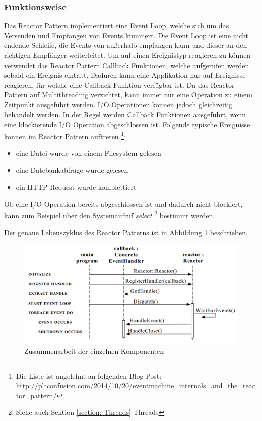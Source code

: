 \subsubsection{Funktionsweise}

Das Reactor Pattern implementiert eine Event Loop, welche sich um das Versenden und Empfangen von Events kümmert. Die Event Loop ist eine nicht endende Schleife, die Events von außerhalb empfangen kann und dieser an den richtigen Empfänger weiterleitet. Um auf einen Ereignistyp reagieren zu können verwendet das Reactor Pattern Callback Funktionen, welche aufgerufen werden sobald ein Ereignis eintritt. Dadurch kann eine Applikation nur auf Ereignisse reagieren, für welche eine Callback Funktion verfügbar ist. Da das Reactor Pattern auf Multithreading verzichtet, kann immer nur eine Operation zu einem Zeitpunkt ausgeführt werden. I/O Operationen können jedoch gleichzeitig behandelt werden. In der Regel werden Callback Funktionen ausgeführt, wenn eine blockierende I/O Operation abgeschlossen ist. Folgende typische Ereignisse können im Reactor Pattern auftreten \footnote{Die Liste ist angelehnt an folgenden Blog-Post: \url{http://pltconfusion.com/2014/10/20/eventmachine_internals_and_the_reactor_pattern/}}:

\begin{itemize}
  \item eine Datei wurde von einem Filesystem gelesen
  \item eine Datebankabfrage wurde gelesen
  \item ein HTTP Request wurde komplettiert
\end{itemize}

Ob eine I/O Operation bereits abgeschlossen ist und dadurch nicht blockiert, kann zum Beispiel über den Systemaufruf \emph{select} \footnote{Siehe auch Sektion \ref{section: Threads} Threads} bestimmt werden.

Der genaue Lebenszyklus des Reactor Patterns ist in Abbildung \ref{figure:reactor_cycle} beschrieben.

\begin{figure}[!htb]
  \centering
  \includegraphics[width=13cm]{images/reactor.png}
  \caption{
    Zusammenarbeit der einzelnen Komponenten \cite[p. 5]{Sch95}
  }
  \label{figure:reactor_cycle}
\end{figure}

